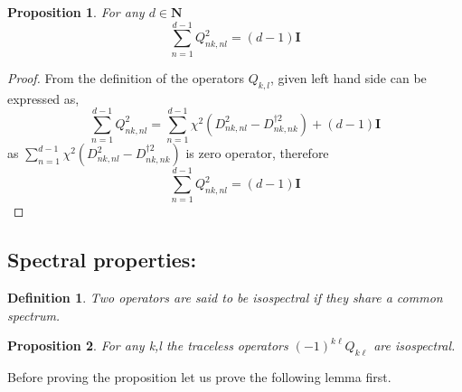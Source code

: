 \documentclass[12pt]{amsart}
\numberwithin{equation}{section}
\newtheorem{proposition}{Proposition}[section]
\newtheorem{definition}{Definition}[section]
\begin{document}
\begin{proposition} For any $d \in \mathbf{N}$ 
    $$    \sum_{n=1}^{d-1}  Q^{2}_{nk,nl} = (d-1) \mathbf{I} $$
\end{proposition}


\begin{proof}
From the definition of the operators $Q_{k,l}$, given  left hand side can be expressed as, \[\sum_{n=1}^{d-1} Q^2_{nk,nl}=\sum_{n=1}^{d-1}\chi^2\left(D^2_{nk,nl}-D^{\dagger 2}_{nk,nk}\right)+(d-1)\mathbf{I}\]
 as $\sum_{n=1}^{d-1}\chi^2\left(D^2_{nk,nl}-D^{\dagger 2}_{nk,nk}\right)$ is zero operator, therefore 
 \[\sum_{n=1}^{d-1} Q^2_{nk,nl}=(d-1)\mathbf{I}\]
\end{proof}

\subsection{Spectral properties:}

\begin{definition}
    Two operators are said to be isospectral if they share a common spectrum.
\end{definition}


\begin{proposition} For any k,l the traceless operators $(-1)^{k \ell} Q_{k\ell}$ are isospectral.

\end{proposition}
Before proving the proposition let us prove the following lemma first.\\
\end{document}
